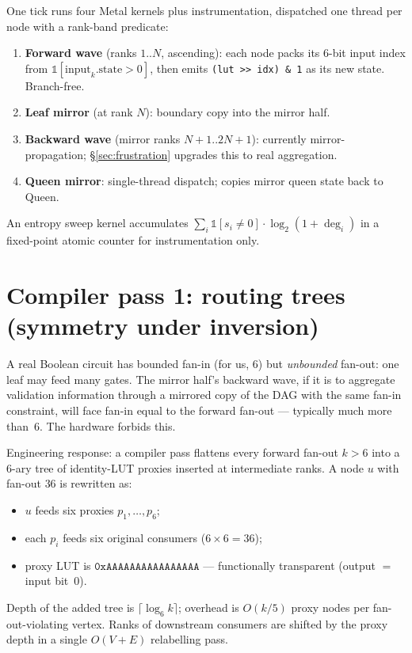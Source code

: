 \documentclass[11pt]{article}
\begin{document}
One tick runs four Metal kernels plus instrumentation, dispatched
one thread per node with a rank-band predicate:

\begin{enumerate}[label=\textbf{\arabic*.},leftmargin=2em]
  \item \textbf{Forward wave} (ranks $1..N$, ascending): each node
        packs its 6-bit input index from
        $\mathbb{1}[\text{input}_k.\text{state} > 0]$, then emits
        \texttt{(lut >> idx) \& 1} as its new state. Branch-free.
  \item \textbf{Leaf mirror} (at rank $N$): boundary copy into the
        mirror half.
  \item \textbf{Backward wave} (mirror ranks $N+1..2N+1$): currently
        mirror-propagation; \S\ref{sec:frustration} upgrades this to
        real aggregation.
  \item \textbf{Queen mirror}: single-thread dispatch; copies mirror
        queen state back to Queen.
\end{enumerate}

An entropy sweep kernel accumulates
$\sum_i \mathbb{1}[s_i \neq 0] \cdot \log_2(1 + \deg_i)$ in a
fixed-point atomic counter for instrumentation only.

\section{Compiler pass 1: routing trees (symmetry under inversion)}
\label{sec:routing}

A real Boolean circuit has bounded fan-in (for us, $6$) but
\emph{unbounded} fan-out: one leaf may feed many gates. The mirror
half's backward wave, if it is to aggregate validation information
through a mirrored copy of the DAG with the same fan-in constraint,
will face fan-in equal to the forward fan-out --- typically much more
than~$6$. The hardware forbids this.

Engineering response: a compiler pass flattens every forward fan-out
$k > 6$ into a 6-ary tree of identity-LUT proxies inserted at
intermediate ranks. A node $u$ with fan-out $36$ is rewritten as:
\begin{itemize}[label={--},leftmargin=1.6em]
  \item $u$ feeds six proxies $p_1,\ldots,p_6$;
  \item each $p_i$ feeds six original consumers ($6\times6 = 36$);
  \item proxy LUT is $\mathtt{0xAAAAAAAAAAAAAAAA}$ --- functionally
        transparent (output $=$ input bit~$0$).
\end{itemize}
Depth of the added tree is $\lceil\log_6 k\rceil$; overhead is
$O(k/5)$ proxy nodes per fan-out-violating vertex. Ranks of
downstream consumers are shifted by the proxy depth in a single
$O(V+E)$ relabelling pass.
\end{document}
